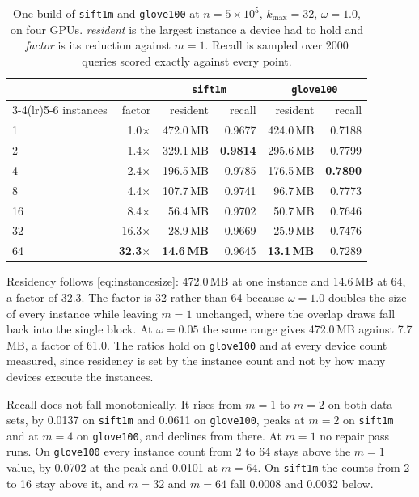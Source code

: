 \documentclass{ieeeaccess}
\newcommand{\kmax}{k_{\max}}
\begin{document}
\begin{table}[!t]
\caption{One build of \texttt{sift1m} and \texttt{glove100} at
$n = 5\times10^5$, $\kmax = 32$, $\omega = 1.0$, on four GPUs. \emph{resident} is
the largest instance a device had to hold and \emph{factor} is its reduction
against $m = 1$. Recall is sampled over 2000 queries scored exactly against
every point.}
\label{tab:memory}
\centering
\footnotesize
\begin{tabular}{@{}lrrrrr@{}}
\toprule
 & & \multicolumn{2}{c}{\texttt{sift1m}} & \multicolumn{2}{c}{\texttt{glove100}} \\
\cmidrule(lr){3-4}\cmidrule(lr){5-6}
instances & factor & resident & recall & resident & recall \\
\midrule
1  & 1.0$\times$  & 472.0\,MB & 0.9677 & 424.0\,MB & 0.7188 \\
2  & 1.4$\times$  & 329.1\,MB & \textbf{0.9814} & 295.6\,MB & 0.7799 \\
4  & 2.4$\times$  & 196.5\,MB & 0.9785 & 176.5\,MB & \textbf{0.7890} \\
8  & 4.4$\times$  & 107.7\,MB & 0.9741 & 96.7\,MB  & 0.7773 \\
16 & 8.4$\times$  & 56.4\,MB  & 0.9702 & 50.7\,MB  & 0.7646 \\
32 & 16.3$\times$ & 28.9\,MB  & 0.9669 & 25.9\,MB  & 0.7476 \\
64 & \textbf{32.3}$\times$ & \textbf{14.6\,MB} & 0.9645 & \textbf{13.1\,MB} & 0.7289 \\
\bottomrule
\end{tabular}
\end{table}

Residency follows \eqref{eq:instancesize}: 472.0\,MB at one instance and
14.6\,MB at 64, a factor of 32.3. The factor is 32 rather than 64 because
$\omega = 1.0$ doubles the size of every instance while leaving $m = 1$
unchanged, where the overlap draws fall back into the single block. At
$\omega = 0.05$ the same range gives 472.0\,MB against 7.7\,MB, a factor of
61.0. The ratios hold on \texttt{glove100} and at every device count measured,
since residency is set by the instance count and not by how many devices execute
the instances.

Recall does not fall monotonically. It rises from $m=1$ to $m=2$ on both data
sets, by 0.0137 on \texttt{sift1m} and 0.0611 on \texttt{glove100}, peaks at
$m = 2$ on \texttt{sift1m} and at $m = 4$ on \texttt{glove100}, and declines
from there. At $m = 1$ no repair pass runs. On \texttt{glove100} every instance
count from 2 to 64 stays above the $m = 1$ value, by 0.0702 at the peak and
0.0101 at $m = 64$. On \texttt{sift1m} the counts from 2 to 16 stay above it,
and $m = 32$ and $m = 64$ fall 0.0008 and 0.0032 below.
\end{document}

